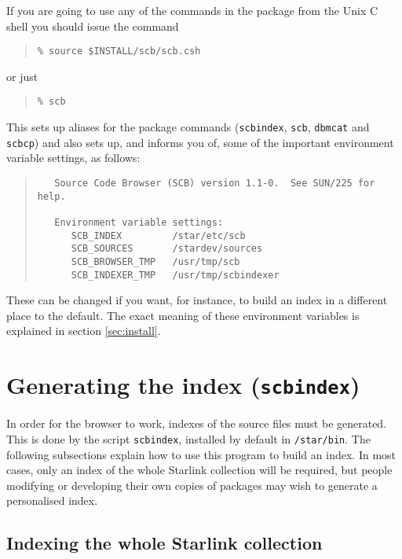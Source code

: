 \documentclass[twoside,11pt]{article}
\newcommand{\xlabel}[1]{}
\renewcommand{\_}{\texttt{\symbol{95}}}
\begin{document}
If you are going to use any of the commands in the package from the
Unix C shell you should issue the command
\begin{quote}
\begin{verbatim}
% source $INSTALL/scb/scb.csh
\end{verbatim}
\end{quote}
or just
\begin{quote}
\begin{verbatim}
% scb
\end{verbatim}
\end{quote}
This sets up aliases for the package commands
({\tt scbindex}, {\tt scb}, {\tt dbmcat} and {\tt scbcp})
and also sets up, and informs you of, some of
the important environment variable settings, as follows:
\begin{quote}
\begin{verbatim}
   Source Code Browser (SCB) version 1.1-0.  See SUN/225 for help.

   Environment variable settings:
      SCB_INDEX         /star/etc/scb
      SCB_SOURCES       /stardev/sources
      SCB_BROWSER_TMP   /usr/tmp/scb
      SCB_INDEXER_TMP   /usr/tmp/scbindexer
\end{verbatim}
\end{quote}
These can be changed if you want, for instance, to build an index in
a different place to the default.
The exact meaning of these environment variables is explained in
section \ref{sec:install}.




\section{\xlabel{sec:indexing}\label{sec:indexing}Generating the index
         ({\tt scbindex})}

In order for the browser to work, indexes of the source files must be
generated.  This is done by the script {\tt scbindex}, installed
by default in {\tt /star/bin}.
The following subsections explain how to use this program to
build an index.  In most cases, only an index of the whole Starlink
collection will be required, but people modifying or developing
their own copies of packages may wish to generate a personalised index.


\subsection{\xlabel{sec:indexing-all}\label{sec:indexing-all}Indexing the whole Starlink collection}
\end{document}

